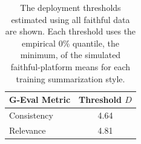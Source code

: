 \begin{table}[h!]
\centering
\caption{The deployment thresholds estimated using all faithful data are shown. Each threshold uses the empirical 0\% quantile, the minimum, of the simulated faithful-platform means for each training summarization style.}
\label{tab:thresholds}
\begin{tabular}{lc}
\toprule
\textbf{G-Eval Metric} & \textbf{Threshold $D$}  \\
\midrule
Consistency & 4.64 \\
Relevance & 4.81 \\
\bottomrule
\end{tabular}
\end{table}

